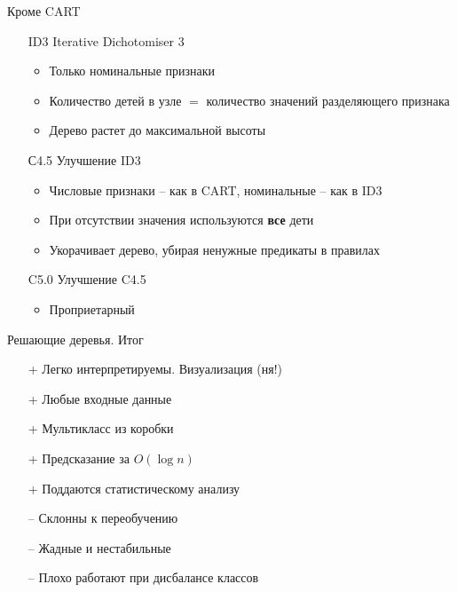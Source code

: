 \documentclass[10pt]{beamer}
\begin{document}

\begin{frame}{Кроме  CART}

\begin{itemize}

\item[ID3] Iterative Dichotomiser 3 
	\begin{itemize}
	\item Только номинальные признаки
	\item Количество детей в узле $=$ количество значений разделяющего признака
	\item Дерево растет до максимальной высоты
	\end{itemize}
	
\item[С4.5] Улучшение ID3
	\begin{itemize}
	\item Числовые признаки -- как в CART, номинальные -- как в ID3
	\item При отсутствии значения используются {\bf все} дети
	\item Укорачивает дерево, убирая ненужные предикаты в правилах
	\end{itemize}
	
\item[C5.0] Улучшение C4.5
	\begin{itemize}
	\item Проприетарный
	\end{itemize}
		
\end{itemize}

\end{frame}


\begin{frame}{Решающие деревья. Итог}

\begin{itemize}
\item[+] Легко интерпретируемы. Визуализация (ня!)
\item[+] Любые входные данные
\item[+] Мультикласс из коробки
\item[+] Предсказание за $O(\log n)$
\item[+] Поддаются статистическому анализу
\end{itemize}

\begin{itemize}
\item[--] Склонны к переобучению
\item[--] Жадные и  нестабильные
\item[--] Плохо работают при дисбалансе классов
\end{itemize}

\end{frame}
\end{document}
